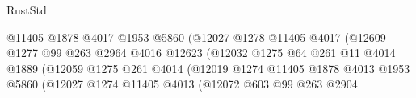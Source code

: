\begin{lexlean}{RustStd}
\begin{coremodule}
                                                @11405
                                                @1878
                                                @4017
                                                @1953
                                                @5860
                                                (@12027
                                                  @1278
                                                  @11405
                                                  @4017
                                                  (@12609
                                                    @1277
                                                    @99
                                                    @263
                                                    @2964
                                                    @4016
                                                    @12623
                                                    (@12032
                                                      @1275
                                                      @64
                                                      @261
                                                      @11
                                                      @4014
                                                      @1889
                                                      (@12059
                                                        @1275
                                                        @261
                                                        @4014
                                                        (@12019
                                                          @1274
                                                          @11405
                                                          @1878
                                                          @4013
                                                          @1953
                                                          @5860
                                                          (@12027
                                                            @1274
                                                            @11405
                                                            @4013
                                                            (@12072
                                                              @603
                                                              @99
                                                              @263
                                                              @2904

\end{coremodule}
\end{lexlean}
